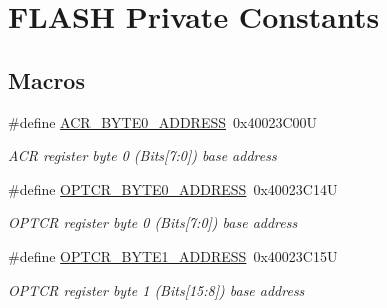 \hypertarget{group___f_l_a_s_h___private___constants}{}\section{F\+L\+A\+SH Private Constants}
\label{group___f_l_a_s_h___private___constants}
\subsection*{Macros}
\begin{DoxyCompactItemize}
\item 
\mbox{\label{group___f_l_a_s_h___private___constants_gaeaca61fbcff69df08100280868bff214}} 
\#define \mbox{\hyperlink{group___f_l_a_s_h___private___constants_gaeaca61fbcff69df08100280868bff214}{A\+C\+R\+\_\+\+B\+Y\+T\+E0\+\_\+\+A\+D\+D\+R\+E\+SS}}~0x40023\+C00U
\begin{DoxyCompactList}\small\item\em A\+CR register byte 0 (Bits\mbox{[}7\+:0\mbox{]}) base address ~\newline
 \end{DoxyCompactList}\item 
\mbox{\label{group___f_l_a_s_h___private___constants_ga8223df020203a97af44e4b14e219d01e}} 
\#define \mbox{\hyperlink{group___f_l_a_s_h___private___constants_ga8223df020203a97af44e4b14e219d01e}{O\+P\+T\+C\+R\+\_\+\+B\+Y\+T\+E0\+\_\+\+A\+D\+D\+R\+E\+SS}}~0x40023\+C14U
\begin{DoxyCompactList}\small\item\em O\+P\+T\+CR register byte 0 (Bits\mbox{[}7\+:0\mbox{]}) base address ~\newline
 \end{DoxyCompactList}\item 
\mbox{\label{group___f_l_a_s_h___private___constants_ga3c08568a9b3a9d213a70eff8e87117ac}} 
\#define \mbox{\hyperlink{group___f_l_a_s_h___private___constants_ga3c08568a9b3a9d213a70eff8e87117ac}{O\+P\+T\+C\+R\+\_\+\+B\+Y\+T\+E1\+\_\+\+A\+D\+D\+R\+E\+SS}}~0x40023\+C15U
\begin{DoxyCompactList}\small\item\em O\+P\+T\+CR register byte 1 (Bits\mbox{[}15\+:8\mbox{]}) base address ~\newline

\end{DoxyCompactList}
\end{DoxyCompactItemize}
